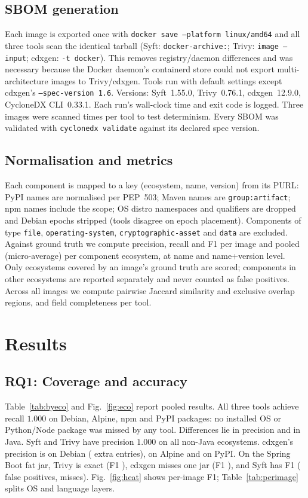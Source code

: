 \documentclass[conference]{IEEEtran}
\newcommand{\syft}{Syft\xspace}
\newcommand{\trivy}{Trivy\xspace}
\newcommand{\cdxgen}{cdxgen\xspace}
\begin{document}
\subsection{SBOM generation}
Each image is exported once with \texttt{docker save --platform linux/amd64} and all three tools scan the
identical tarball (\syft: \texttt{docker-archive:}; \trivy: \texttt{image --input}; \cdxgen:
\texttt{-t docker}). This removes registry/daemon differences and was necessary because the Docker
daemon's containerd store could not export multi-architecture images to \trivy/\cdxgen. Tools run with
default settings except \cdxgen's \texttt{--spec-version 1.6}. Versions: \syft~1.55.0, \trivy~0.76.1,
\cdxgen~12.9.0, CycloneDX CLI~0.33.1. Each run's wall-clock time and exit code is logged. Three images
were scanned \NDetRuns{} times per tool to test determinism. Every SBOM was validated with
\texttt{cyclonedx validate} against its declared spec version.

\subsection{Normalisation and metrics}
Each component is mapped to a key (ecosystem, name, version) from its PURL: PyPI names are normalised
per PEP~503; Maven names are \texttt{group:artifact}; npm names include the scope; OS distro namespaces
and qualifiers are dropped and Debian epochs stripped (tools disagree on epoch placement). Components of
type \texttt{file}, \texttt{operating-system}, \texttt{cryptographic-asset} and \texttt{data} are
excluded. Against ground truth we compute precision, recall and F1 per image and pooled (micro-average)
per component ecosystem, at name and name+version level. Only ecosystems covered by an image's ground
truth are scored; components in other ecosystems are reported separately and never counted as false
positives. Across all images we compute pairwise Jaccard similarity and exclusive overlap regions, and
field completeness per tool.

\section{Results}
\subsection{RQ1: Coverage and accuracy}
Table~\ref{tab:byeco} and Fig.~\ref{fig:eco} report pooled results. All three tools achieve recall
$1.000$ on Debian, Alpine, npm and PyPI packages: no installed OS or Python/Node package was missed by
any tool. Differences lie in precision and in Java.
\syft and \trivy have precision $1.000$ on all non-Java ecosystems. \cdxgen's precision is
\PCdxgenDeb{} on Debian (\FPCdxgenDeb{} extra entries), \PCdxgenApk{} on Alpine and \PCdxgenPypi{} on PyPI.
On the Spring Boot fat jar, \trivy is exact (F1 \FTrivyMaven), \cdxgen misses one jar
(F1 \FCdxgenMaven), and \syft has F1 \FSyftMaven{} (\FPSyftMaven{} false positives, \FNSyftMaven{} misses).
Fig.~\ref{fig:heat} shows per-image F1; Table~\ref{tab:perimage} splits OS and language layers.
\end{document}
